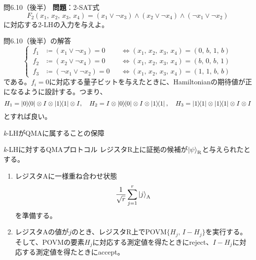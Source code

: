 \documentclass[11pt,aspectratio=169,xcolor=dvipsnames,table,dvipdfmx]{beamer}
\theoremstyle{definition}
\begin{document}
\begin{frame}{問6.10（後半）}
  \textbf{問題}：2-SAT式
  \begin{equation}
    F_2(x_1,\,x_2,\,x_3,\,x_4) = (x_1\lor \lnot x_3)\land(x_2\lor \lnot x_4)\land(\lnot x_1\lor \lnot x_2)
  \end{equation}
  に対応する2-LHの入力を与えよ。
  \begin{block}{問6.10（後半）の解答}
    \begin{equation*}
      \left\{ \,
      \begin{aligned}
        f_1 & \coloneqq (x_1\lor \lnot x_3)= 0        &  & \Leftrightarrow (x_1,\,x_2,\,x_3,\,x_4) = (0,\,b,\,1,\,b) \\
        f_2 & \coloneqq (x_2\lor \lnot x_4) = 0       &  & \Leftrightarrow (x_1,\,x_2,\,x_3,\,x_4) = (b,\,0,\,b,\,1) \\
        f_3 & \coloneqq (\lnot x_1\lor \lnot x_2) = 0 &  & \Leftrightarrow (x_1,\,x_2,\,x_3,\,x_4) = (1,\,1,\,b,\,b)
      \end{aligned}
      \right.
    \end{equation*}
    である。$f_i =0$に対応する量子ビットを与えたときに、Hamiltonianの期待値が正になるように設計する。つまり、
    \begin{equation*}
      H_1 = \ketbra{0}\otimes I\otimes \ketbra{1}\otimes I,\quad H_2 = I \otimes \ketbra{0}\otimes I\otimes \ketbra{1},\quad H_3 = \ketbra{1}\otimes \ketbra{1}\otimes I\otimes I
    \end{equation*}
    とすれば良い。
  \end{block}
\end{frame}

\begin{frame}{\textit{k}-LHがQMAに属することの保障}
  \begin{exampleblock}{\textit{k}-LHに対するQMAプロトコル}
    レジスタR上に証拠の候補が$\ket{\psi}_{\text{R}}$と与えられたとする。
    \begin{enumerate}
      \item レジスタAに一様重ね合わせ状態
            \begin{equation*}
              \frac{1}{\sqrt{r}}\sum_{j=1}^r \ket{j}_{\text{A}}
            \end{equation*}
            を準備する。
      \item レジスタAの値が$j$のとき、レジスタR上でPOVM$\{H_j,\,I-H_j\}$を実行する。
            そして、POVMの要素$H_j$に対応する測定値を得たときにreject、$I-H_j$に対応する測定値を得たときにaccept。
    \end{enumerate}
  \end{exampleblock}
\end{frame}
\end{document}
